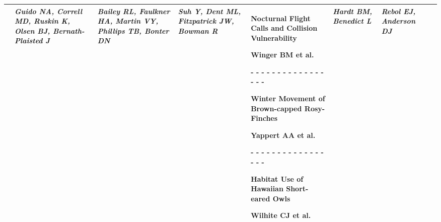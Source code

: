 \begin{tabular}{|x{0.8cm}|x{2.65cm}|x{2.65cm}|x{2.65cm}|y{2.65cm}|x{2.65cm}|x{2.65cm}|@{}m{0pt}@{}}
& \par \vspace{8pt} \textit{Guido NA, Correll MD, Ruskin K, Olsen BJ, Bernath-Plaisted J} &  \par \vspace{8pt} \textit{Bailey RL, Faulkner HA, Martin VY, Phillips TB, Bonter DN} &  \par \vspace{8pt} \textit{Suh Y, Dent ML, Fitzpatrick JW, Bowman R} & \scriptsize Nocturnal Flight Calls and Collision Vulnerability\par \tiny Winger BM et al.\par - - - - - - - - - - - - - - - - - \par \vspace{2pt} \scriptsize Winter Movement of Brown-capped Rosy-Finches\par \tiny Yappert AA et al.\par - - - - - - - - - - - - - - - - - \par \vspace{2pt} \scriptsize Habitat Use of Hawaiian Short-eared Owls\par \tiny Wilhite CJ et al. &  \par \vspace{8pt} \textit{Hardt BM, Benedict L} &  \par \vspace{8pt} \textit{Rebol EJ, Anderson DJ}&\\[25ex]
\hline

\end{tabular}
